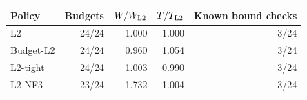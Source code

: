 \begin{tabular}{lrrrr}
\toprule
Policy & Budgets & $W/W_{\rm L2}$ & $T/T_{\rm L2}$ & Known bound checks\\
\midrule
L2 & 24/24 & 1.000 & 1.000 & 3/24\\
Budget-L2 & 24/24 & 0.960 & 1.054 & 3/24\\
L2-tight & 24/24 & 1.003 & 0.990 & 3/24\\
L2-NF3 & 23/24 & 1.732 & 1.004 & 3/24\\
\bottomrule
\end{tabular}
